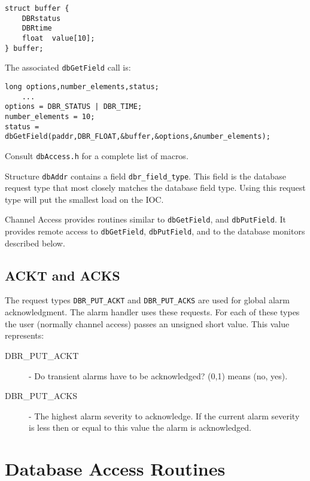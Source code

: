 \begin{verbatim}
struct buffer {
    DBRstatus
    DBRtime
    float  value[10];
} buffer;
\end{verbatim}

The associated \verb|dbGetField| call is:

\begin{verbatim}
long options,number_elements,status;
    ...
options = DBR_STATUS | DBR_TIME;
number_elements = 10;
status = dbGetField(paddr,DBR_FLOAT,&buffer,&options,&number_elements);
\end{verbatim}

Consult \verb|dbAccess.h| for a complete list of macros.

Structure \verb|dbAddr| contains a field \verb|dbr_field_type|. This field is the database request type that most closely matches 
the database field type. Using this request type will put the smallest load on the IOC.

Channel Access provides routines similar to \verb|dbGetField|, and \verb|dbPutField|. It provides remote access to 
\verb|dbGetField|, \verb|dbPutField|, and to the database monitors described below.

\subsection{ACKT and ACKS}

The request types \verb|DBR_PUT_ACKT| and \verb|DBR_PUT_ACKS| are used for global alarm acknowledgment. The alarm handler 
uses these requests. For each of these types the user (normally channel access) passes an unsigned short value. This value 
represents:

\begin{description}

\item[DBR\_PUT\_ACKT]  - Do transient alarms have to be acknowledged? (0,1) means (no, yes).

\item[DBR\_PUT\_ACKS] - The highest alarm severity to acknowledge. If the current alarm severity is less then or equal to this 
value the alarm is acknowledged.

\end{description}

\section{Database Access Routines}

